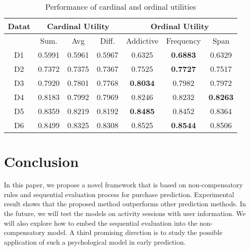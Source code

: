 \documentclass[sigconf]{acmart}
\begin{document}
\begin{table}[htbp]
\caption{Performance of cardinal and ordinal utilities}
\label{tab:utility}
\begin{tabular}{|c|c|c|c|c|c|c|}
\hline
{Datat} & \multicolumn{3}{|c|}{Cardinal Utility} & \multicolumn{3}{|c|}{Ordinal Utility} \\\hline
 &  Sum. & Avg & Diff. & Addictive  & Frequency &Span \\\hline
D1 & 0.5991	&0.5961&	0.5967	&0.6325	&\bf{0.6883}	&0.6329\\\hline
D2 & 0.7372	&0.7375&	0.7367&	0.7525	&\bf{0.7727}	&0.7517\\\hline
D3 & 0.7920&	0.7801	&0.7768	&\bf{0.8034}&	0.7982&0.7972\\\hline
D4 &0.8183&	0.7992	&0.7969	&0.8246&	0.8232	&\bf{0.8263} \\\hline
D5& 0.8359	&0.8219&	0.8192&	\bf{0.8485}&	0.8452&0.8364\\\hline
D6 & 0.8499	&0.8325	&0.8308&	0.8525&	\bf{0.8544}&	0.8506
\\ \hline \end{tabular}
\end{table}


\section{Conclusion}\label{sec:conclusion}
In this paper, we propose a novel framework that is based on non-compensatory rules and sequential evaluation process for purchase prediction. Experimental result shows that the proposed method outperforms other prediction methods. In the future, we will test the models on activity sessions with user information. We will also explore how to embed the sequential evaluation into the non-compensatory model. A third promising direction is to study the possible application of such a psychological model in early prediction.
\end{document}
